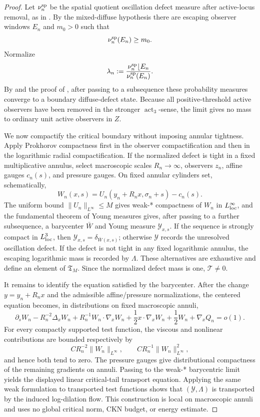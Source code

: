 \documentclass[11pt]{amsart}
\numberwithin{equation}{section}
\theoremstyle{plain}
\theoremstyle{definition}
\theoremstyle{remark}
\newcommand{\Tcrit}{\mathfrak T_M}
\newcommand{\actthree}{\operatorname{act}_3}
\begin{document}
\begin{proof}
Let \(\nu_n^{\rm sp}\) be the spatial quotient oscillation defect measure
after active-locus removal, as in
.  By the mixed-diffuse
hypothesis there are escaping
observer windows \(E_n\) and \(m_0>0\) such that
\[
   \nu_n^{\rm sp}(E_n)\ge m_0 .
\]
Normalize
\[
   \lambda_n:=
   \frac{\nu_n^{\rm sp}\lfloor E_n}{\nu_n^{\rm sp}(E_n)} .
\]
By  and the proof of
, after passing to a subsequence these
probability measures converge to a boundary diffuse-defect state.  Because all
positive-threshold active observers have been removed in the stronger
\(\actthree\)-sense, the limit gives no mass to ordinary unit active observers
in \(Z\).

We now compactify the critical boundary without imposing annular tightness.
Apply Prokhorov compactness first in the observer compactification and then in
the logarithmic radial compactification.  If the normalized defect is tight in a
fixed multiplicative annulus, select macroscopic scales \(R_n\to\infty\),
observers \(z_n\), affine gauges \(c_n(s)\), and pressure gauges.  On fixed
annular cylinders set, schematically,
\[
   W_n(x,s)=U_n(y_n+R_nx,\sigma_n+s)-c_n(s).
\]
The uniform bound \(\|U_n\|_{L^\infty}\le M\) gives weak-* compactness of
\(W_n\) in \(L^\infty_{\rm loc}\), and the fundamental theorem of Young
measures gives, after passing to a further subsequence, a barycenter
\(\bar W\) and Young measure \(\mathcal Y_{x,s}\).  If the sequence is strongly
compact in \(L^3_{\rm loc}\), then \(\mathcal Y_{x,s}=\delta_{\bar W(x,s)}\);
otherwise \(\mathcal Y\) records the unresolved oscillation defect.  If the
defect is not tight in any fixed logarithmic annulus, the escaping logarithmic
mass is recorded by \(\Lambda\).  These alternatives are exhaustive and define
an element of \(\Tcrit\).  Since the normalized defect mass is one,
\(\mathcal T\ne0\).

It remains to identify the equation satisfied by the barycenter.  After the
change \(y=y_n+R_nx\) and the admissible affine/pressure normalizations, the
centered equation becomes, in distributions on fixed macroscopic annuli,
\[
   \partial_s W_n
   -R_n^{-2}\Delta_xW_n
   +R_n^{-1}W_n\cdot\nabla_xW_n
   +\frac12x\cdot\nabla_xW_n
   +\frac12W_n
   +\nabla_xQ_n
   =o(1).
\]
For every compactly supported test function, the viscous and nonlinear
contributions are bounded respectively by
\[
   CR_n^{-2}\|W_n\|_{L^\infty},
   \qquad
   CR_n^{-1}\|W_n\|_{L^\infty}^2 ,
\]
and hence both tend to zero.  The pressure gauges give distributional
compactness of the remaining gradients on annuli.  Passing to the weak-*
barycentric limit yields the displayed linear critical-tail transport equation.
Applying the same weak formulation to transported test functions
shows that \((\mathcal Y,\Lambda)\) is transported by the induced log-dilation
flow.  This construction is local on macroscopic annuli and uses no global
critical norm, CKN budget, or energy estimate.
\end{proof}
\end{document}
